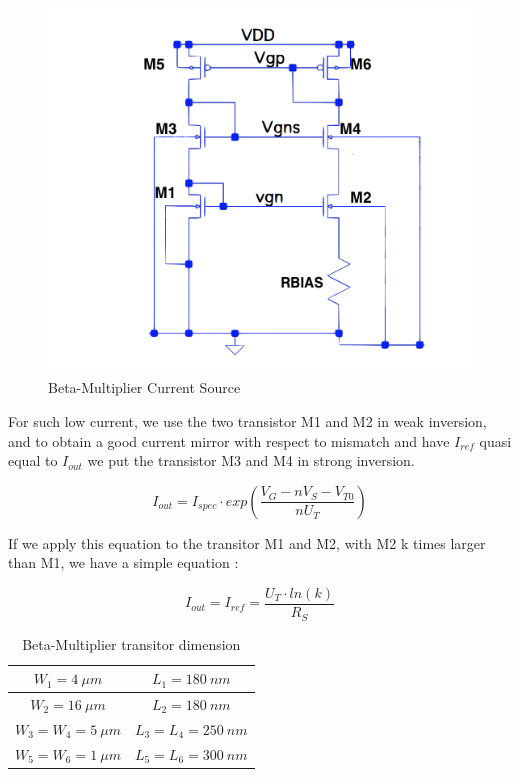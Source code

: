 \documentclass[11pt,a4paper]{report}
\begin{document}
\begin{figure}[h]
  \begin{center}
    \includegraphics[scale=0.3]{photo/beta_multiplier}
  \end{center}
  \caption{Beta-Multiplier Current Source}
  \label{beta_m}
\end{figure}

For such low current, we use the two transistor M1 and M2 in weak inversion, and to obtain a good current mirror with respect to mismatch and have $I_{ref}$ quasi equal to $I_{out}$ we put the transistor M3 and M4 in strong inversion.

\begin{equation}
  I_{out} = I_{spec} \cdot exp \left( \frac{V_G - n V_S - V_{T0}}{n U_T}\right)
\end{equation}

If we apply this equation to the transitor M1 and M2, with M2 k times larger than M1, we have a simple equation :

\begin{equation}
  I_{out} = I_{ref} = \frac{U_T \cdot ln(k)}{R_S}
\end{equation}

\begin{table}[h]
  \begin{center}
  \begin{tabular}{|c|c|}\hline
    $W_1 = 4~\mu m$       & $L_1 = 180~ nm$ \\ \hline
    $W_2 =  16~ \mu m$       & $L_2 = 180~ nm$ \\ \hline
    $W_3 = W_4 = 5~ \mu m$ & $L_3 = L_4 = 250~ nm$  \\ \hline
    $W_5 = W_6 = 1~ \mu m$ & $L_5 = L_6 = 300~ nm$ \\ \hline
  \end{tabular}
\end{center}
\caption{Beta-Multiplier transitor dimension}
\end{table}
\end{document}
